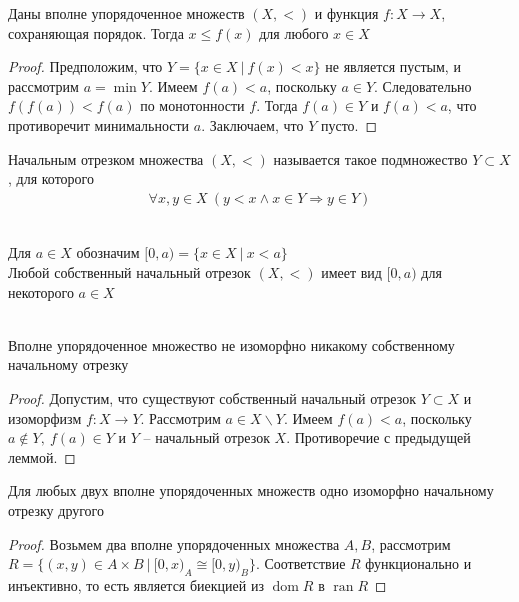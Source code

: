 \begin{lem}
Даны вполне упорядоченное множеств $(X, <)$ и функция $f: X \to X$, сохраняющая порядок. Тогда $x \leqslant f(x)$ для любого $x \in X$
\end{lem}
\begin{proof}
Предположим, что $Y = \{x \in X\ |\ f(x) < x\}$ не является пустым, и рассмотрим $a = \min Y$. Имеем $f(a) < a$, поскольку $a \in Y$. Следовательно $f(f(a)) < f(a)$ по монотонности $f$. Тогда $f(a) \in Y$ и $f(a) < a$, что противоречит минимальности $a$. Заключаем, что $Y$ пусто.
\end{proof}

\begin{defn}
Начальным отрезком множества $(X, <)$ называется такое подмножество $Y \subset X$, для которого
\begin{gather*}
	\forall x,y \in X\ (y < x \wedge x \in Y \Rightarrow y \in Y)
\end{gather*}
\end{defn}

\\
Для $a \in X$ обозначим $[0,a) = \{x \in X\ |\ x < a\}$
\\
Любой собственный начальный отрезок $(X, <)$ имеет вид $[0,a)$ для некоторого $a \in X$\\
\\
\begin{lem}
Вполне упорядоченное множество не изоморфно никакому собственному начальному отрезку
\end{lem}

\begin{proof}
Допустим, что существуют собственный начальный отрезок $Y \subset X$ и изоморфизм $f: X \to Y$. Рассмотрим $a \in X \backslash Y$. Имеем $f(a) < a$, поскольку $a \notin Y,\ f(a) \in Y$ и $Y$ -- начальный отрезок $X$. Противоречие с предыдущей леммой.
\end{proof}

\begin{theo}[Кантор]
Для любых двух вполне упорядоченных множеств одно изоморфно начальному отрезку другого
\end{theo}
\begin{proof}
Возьмем два вполне упорядоченных множества $A, B$, рассмотрим $R = \{(x,y) \in A \times B\ |\ [0,x)_A \cong [0,y)_B\}$. Соответствие $R$ функционально и инъективно, то есть является биекцией из $\operatorname{dom} R$ в $\operatorname{ran} R$
\end{proof}